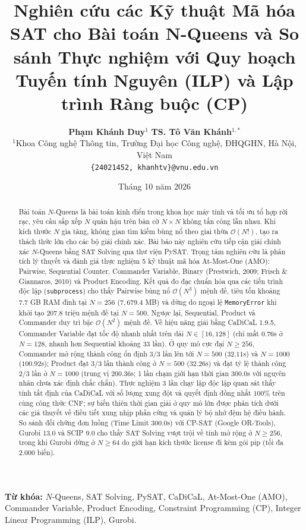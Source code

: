 \documentclass[11pt,a4paper]{article}
\title{\Large \textbf{Nghiên cứu các Kỹ thuật Mã hóa SAT cho Bài toán N-Queens và So sánh Thực nghiệm với Quy hoạch Tuyến tính Nguyên (ILP) và Lập trình Ràng buộc (CP)}}
\author{
    \textbf{Phạm Khánh Duy}$^{1}$ \quad \textbf{TS. Tô Văn Khánh}$^{1,*}$ \\[0.5em]
    $^{1}$Khoa Công nghệ Thông tin, Trường Đại học Công nghệ, ĐHQGHN, Hà Nội, Việt Nam \\
    \texttt{\{24021452, khanhtv\}@vnu.edu.vn}
}
\date{Tháng 10 năm 2026}
\begin{document}
\maketitle

\begin{abstract}
Bài toán $N$-Queens là bài toán kinh điển trong khoa học máy tính và tối ưu tổ hợp rời rạc, yêu cầu sắp xếp $N$ quân hậu trên bàn cờ $N \times N$ không tấn công lẫn nhau. Khi kích thước $N$ gia tăng, không gian tìm kiếm bùng nổ theo giai thừa $\mathcal{O}(N!)$, tạo ra thách thức lớn cho các bộ giải chính xác. Bài báo này nghiên cứu tiếp cận giải chính xác $N$-Queens bằng SAT Solving qua thư viện PySAT. Trọng tâm nghiên cứu là phân tích lý thuyết và đánh giá thực nghiệm 5 kỹ thuật mã hóa At-Most-One (AMO): Pairwise, Sequential Counter, Commander Variable, Binary (Prestwich, 2009; Frisch \& Giannaros, 2010) và Product Encoding. Kết quả đo đạc chuẩn hóa qua các tiến trình độc lập (\texttt{subprocess}) cho thấy Pairwise bùng nổ $\mathcal{O}(N^3)$ mệnh đề, tiêu tốn khoảng 7.7 GB RAM đỉnh tại $N=256$ ($7{,}679.4$ MB) và dừng do ngoại lệ \texttt{MemoryError} khi khởi tạo $207.8$ triệu mệnh đề tại $N=500$. Ngược lại, Sequential, Product và Commander duy trì bậc $\mathcal{O}(N^2)$ mệnh đề. Về hiệu năng giải bằng CaDiCaL 1.9.5, Commander Variable đạt tốc độ nhanh nhất trên dải $N \in [16, 128]$ (chỉ mất $0.76$s ở $N=128$, nhanh hơn Sequential khoảng 33 lần). Ở quy mô cực đại $N \ge 256$, Commander mở rộng thành công ổn định 3/3 lần lên tới $N=500$ ($32.11$s) và $N=1000$ ($100.92$s); Product đạt 3/3 lần thành công ở $N=500$ ($32.26$s) và đạt tỷ lệ thành công 2/3 lần ở $N=1000$ (trung vị $200.36$s; 1 lần chạm giới hạn thời gian 300.0s với nguyên nhân chưa xác định chắc chắn). Thực nghiệm 3 lần chạy lặp độc lập quan sát thấy tính tất định của CaDiCaL với số lượng xung đột và quyết định đồng nhất $100\%$ trên cùng công thức CNF; sự biến thiên thời gian giải ở quy mô lớn được phân tích dưới các giả thuyết về điều tiết xung nhịp phần cứng và quản lý bộ nhớ đệm hệ điều hành. So sánh đối chứng đơn luồng (Time Limit 300.0s) với CP-SAT (Google OR-Tools), Gurobi 13.0 và SCIP 9.0 cho thấy SAT Solving vượt trội về tính mở rộng ở $N \ge 256$, trong khi Gurobi dừng ở $N \ge 64$ do giới hạn kích thước license đi kèm gói pip (tối đa 2.000 biến).
\end{abstract}

\noindent\textbf{Từ khóa:} $N$-Queens, SAT Solving, PySAT, CaDiCaL, At-Most-One (AMO), Commander Variable, Product Encoding, Constraint Programming (CP), Integer Linear Programming (ILP), Gurobi.
\end{document}
